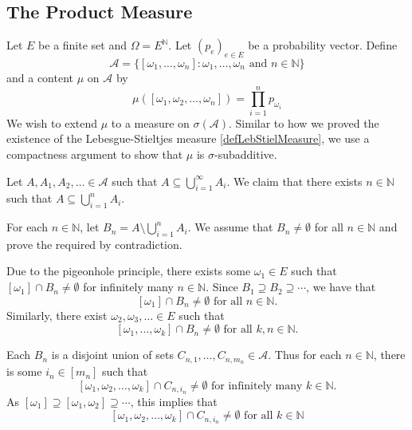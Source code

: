 \begin{enumerate}
    
    
\end{enumerate}

\subsection{The Product Measure}

Let $E$ be a finite set and $\Omega=E^\mathbb{N}$. Let $(p_e)_{e\in E}$ be a probability vector. Define
$$\mathcal{A}=\{[\omega_1,\ldots,\omega_n]:\omega_1,\ldots,\omega_n\text{ and }n\in\mathbb{N}\}$$
and a content $\mu$ on $\mathcal{A}$ by
$$\mu([\omega_1,\omega_2,\ldots,\omega_n])=\prod_{i=1}^n p_{\omega_i}$$
We wish to extend $\mu$ to a measure on $\sigma(\mathcal{A})$. Similar to how we proved the existence of the Lebesgue-Stieltjes measure \ref{defLebStielMeasure}, we use a compactness argument to show that $\mu$ is $\sigma$-subadditive.

Let $A,A_1,A_2,\ldots\in\mathcal{A}$ such that $A\subseteq\bigcup_{i=1}^\infty A_i$. We claim that there exists $n\in\mathbb{N}$ such that $A\subseteq\bigcup_{i=1}^n A_i.$

For each $n\in\mathbb{N}$, let $B_n=A\setminus\bigcup_{i=1}^n A_i$. We assume that $B_n\neq\emptyset$ for all $n\in\mathbb{N}$ and prove the required by contradiction.

Due to the pigeonhole principle, there exists some $\omega_1\in E$ such that $[\omega_1]\cap B_n\neq\emptyset$ for infinitely many $n\in\mathbb{N}$. Since $B_1\supseteq B_2\supseteq\cdots$, we have that
$$[\omega_1]\cap B_n\neq\emptyset\text{ for all }n\in\mathbb{N}.$$
Similarly, there exist $\omega_2,\omega_3,\ldots\in E$ such that
$$[\omega_1,\ldots,\omega_k]\cap B_n\neq\emptyset\text{ for all }k,n\in\mathbb{N}.$$

Each $B_n$ is a disjoint union of sets $C_{n,1},\ldots,C_{n,m_n}\in\mathcal{A}$. Thus for each $n\in\mathbb{N}$, there is some $i_n\in[m_n]$ such that
$$[\omega_1,\omega_2,\ldots,\omega_k]\cap C_{n,i_n}\neq\emptyset\text{ for infinitely many }k\in\mathbb{N}.$$
As $[\omega_1]\supseteq[\omega_1,\omega_2]\supseteq\cdots$, this implies that
$$[\omega_1,\omega_2,\ldots,\omega_k]\cap C_{n,i_n}\neq\emptyset\text{ for all } k\in\mathbb{N}$$

